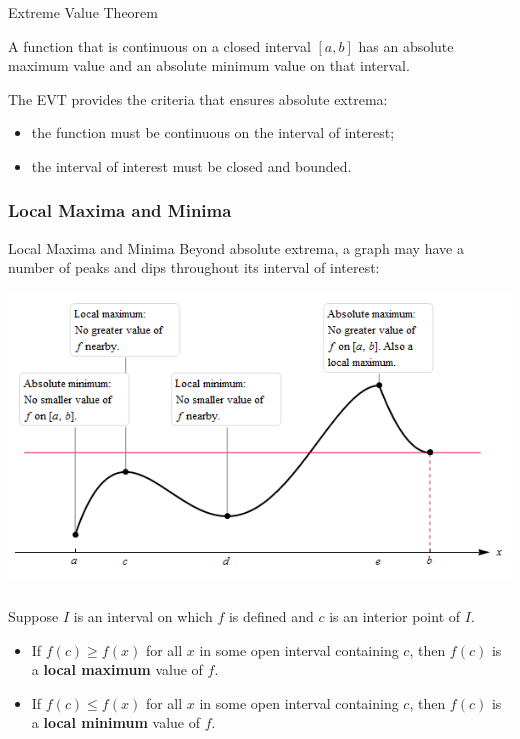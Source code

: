 \documentclass[cal1spr16Lectures.tex]{subfiles}
\begin{document}
\begin{frame}{\small Extreme Value Theorem}
\small
\begin{thm} A function that is continuous on a closed interval $[a,b]$ has an absolute maximum value and an absolute minimum value on that interval. \end{thm}

\vspace{1pc}
The EVT provides the criteria that ensures absolute extrema:
\begin{itemize}
\item the function must be continuous on the interval of interest;
\item the interval of interest must be closed and bounded.
\end{itemize}
\end{frame}

\subsubsection{Local Maxima and Minima}

\begin{frame}{\small Local Maxima and Minima}
\small
Beyond absolute extrema, a graph may have a number of peaks and dips throughout its interval of interest:
\begin{center}
\includegraphics[scale=0.625]{pictures/Fig4_5}
\end{center}
\end{frame}

\begin{frame}
\frametitle{}
\small
\begin{dfn} Suppose $I$ is an interval on which $f$ is defined and $c$ is an interior point of $I$.
\begin{itemize}
\item If $f(c)\ge f(x)$ for all $x$ in some open interval containing $c$, then $f(c)$ is a {\bf local maximum} value of $f$.
\item If $f(c)\le f(x)$ for all $x$ in some open interval containing $c$, then $f(c)$ is a {\bf local minimum} value of $f$.
\end{itemize}
\end{dfn}
\end{frame}
\end{document}
